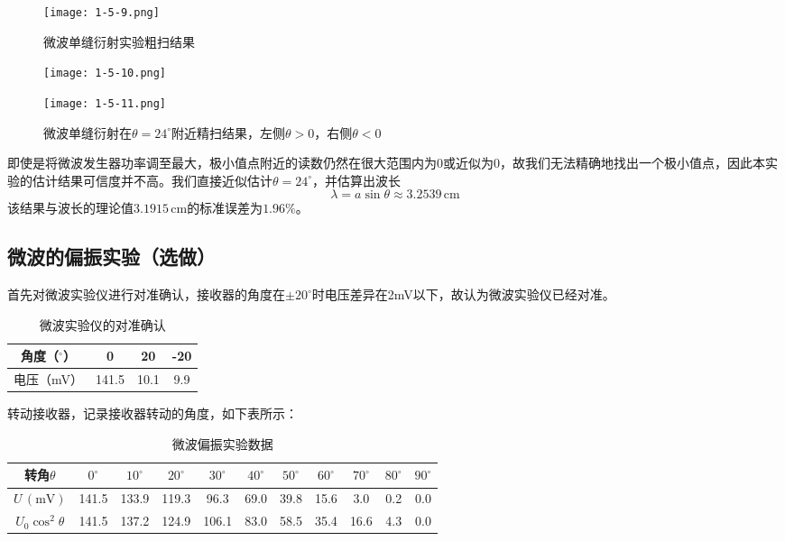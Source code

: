 \documentclass[12pt]{article}
\begin{document}
\newpage

\begin{figure}[h!]
    \centering
    \texttt{[image: 1-5-9.png]}
    \caption{微波单缝衍射实验粗扫结果}
\end{figure}

\begin{figure}[h!]
    \centering
    \begin{minipage}[c]{0.4\textwidth}
        \texttt{[image: 1-5-10.png]}
    \end{minipage}
    \quad\begin{minipage}[c]{0.4\textwidth}
        \texttt{[image: 1-5-11.png]}
    \end{minipage}
    \caption{微波单缝衍射在$\theta=24^\circ$附近精扫结果，左侧$\theta>0$，右侧$\theta<0$}
\end{figure}

即使是将微波发生器功率调至最大，极小值点附近的读数仍然在很大范围内为0或近似为0，故我们无法精确地找出一个极小值点，因此本实验的估计结果可信度并不高。我们直接近似估计$\theta=24^\circ$，并估算出波长
\[
    \lambda=a\sin\theta\approx3.2539\,\mathrm{cm}
\]
该结果与波长的理论值$3.1915\,\mathrm{cm}$的标准误差为$1.96\%$。

\subsection{微波的偏振实验（选做）}
首先对微波实验仪进行对准确认，接收器的角度在$\pm20^\circ$时电压差异在2mV以下，故认为微波实验仪已经对准。

\begin{table}[h!]
    \centering
    \begin{tabular}{|c|c|c|c|}
    \hline
    角度（$^\circ$） & 0     & 20   & -20 \\ \hline
    电压（mV）       & 141.5 & 10.1 & 9.9 \\ \hline
    \end{tabular}
    \caption{微波实验仪的对准确认}
\end{table}

转动接收器，记录接收器转动的角度，如下表所示：

\begin{table}[h!]
    \centering
    \begin{tabular}{|c|c|c|c|c|c|c|c|c|c|c|}
        \hline
        转角$\theta$ & $0^\circ$ & $10^\circ$ & $20^\circ$ & $30^\circ$ & $40^\circ$ & $50^\circ$ & $60^\circ$ & $70^\circ$ & $80^\circ$ & $90^\circ$ \\
        \hline
        $U\,(\mathrm{mV})$ & 141.5 & 133.9 & 119.3 & 96.3 & 69.0 & 39.8 & 15.6 & 3.0 & 0.2 & 0.0 \\
        \hline
        $U_0\cos^2\theta$ & 141.5 & 137.2 & 124.9 & 106.1 & 83.0 & 58.5 & 35.4 & 16.6 & 4.3 & 0.0 \\
        \hline
    \end{tabular}
    \caption{微波偏振实验数据}
\end{table}
\end{document}
